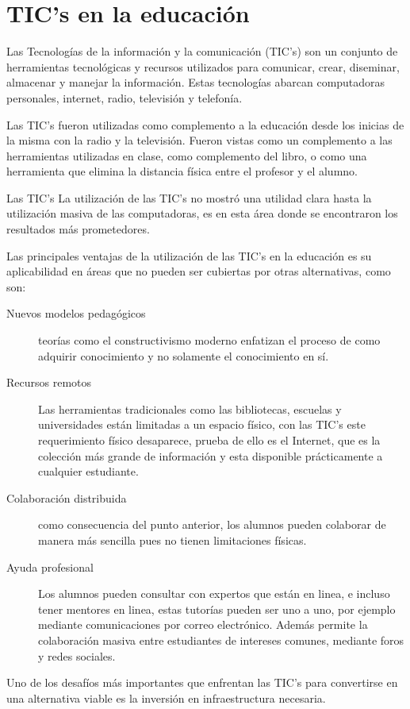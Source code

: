 \section{TIC's en la educación}

Las Tecnologías de la información y la comunicación (TIC's) son un conjunto de
herramientas tecnológicas y recursos utilizados para comunicar, crear,
diseminar, almacenar y manejar la información\cite{unesco:ict}. Estas
tecnologías abarcan computadoras personales, internet, radio, televisión y
telefonía\cite{tinio:ict}.

Las TIC's fueron utilizadas como complemento a la educación desde los inicias de
la misma con la radio y la televisión. Fueron vistas como un complemento a las
herramientas utilizadas en clase, como complemento del libro, o como una
herramienta que elimina la distancia física entre el profesor y el
alumno\cite{unesco:ict}. 

Las TIC's 
La utilización de las TIC's no mostró una utilidad clara hasta la utilización
masiva de las computadoras, es en esta área donde se encontraron los resultados
más prometedores\cite{unesco:ict}. 

Las principales ventajas de la utilización de las TIC's en la educación es su
aplicabilidad en áreas que no pueden ser cubiertas por otras alternativas, como
son:
\begin{description}
    \item[Nuevos modelos pedagógicos] teorías como el constructivismo moderno
	    enfatizan el proceso de como adquirir conocimiento y no solamente el
	    conocimiento en sí.
    \item[Recursos remotos] Las herramientas tradicionales como las bibliotecas,
	    escuelas y universidades están limitadas a un espacio físico, con
	    las TIC's este requerimiento físico desaparece, prueba de ello es el
	    Internet, que es la colección más grande de información y esta
	    disponible prácticamente a cualquier estudiante.
    \item[Colaboración distribuida] como consecuencia del punto anterior, los
	    alumnos pueden colaborar de manera más sencilla pues no tienen
	    limitaciones físicas.
    \item[Ayuda profesional] Los alumnos pueden consultar con expertos que están
	    en linea, e incluso tener mentores en linea, estas tutorías pueden
	    ser uno a uno, por ejemplo mediante comunicaciones por correo
	    electrónico. Además permite la colaboración masiva entre estudiantes
	    de intereses comunes, mediante foros y redes sociales.
\end{description}

Uno de los desafíos más importantes que enfrentan las TIC's para convertirse en
una alternativa viable es la inversión en infraestructura necesaria.
